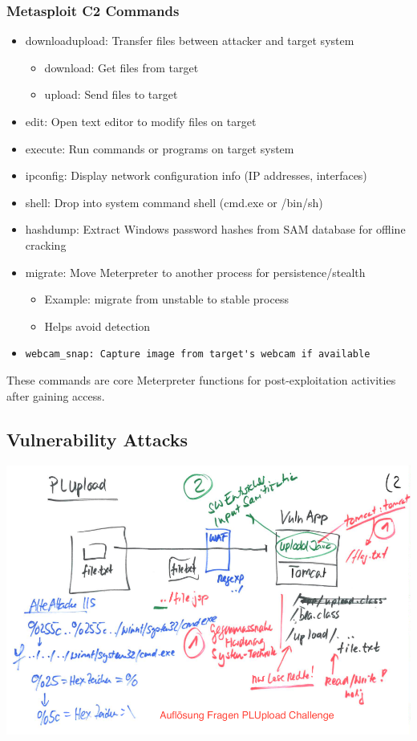 \subsubsection*{Metasploit C2 Commands}
\begin{itemize}
	\item download\/upload: Transfer files between attacker and target system
  \begin{itemize}
    \tightlist
		\item download: Get files from target
		\item upload: Send files to target
	\end{itemize}

	\item edit: Open text editor to modify files on target

	\item execute: Run commands or programs on target system

	\item ipconfig: Display network configuration info (IP addresses, interfaces)

	\item shell: Drop into system command shell (cmd.exe or /bin/sh)

	\item hashdump: Extract Windows password hashes from SAM database for offline cracking

	\item migrate: Move Meterpreter to another process for persistence/stealth
  \begin{itemize}
    \tightlist
		\item Example: migrate from unstable to stable process
		\item Helps avoid detection
	\end{itemize}
	\item \lstinline|webcam_snap: Capture image from target's webcam if available|
\end{itemize}
These commands are core Meterpreter functions for post-exploitation activities after gaining access.

\subsection{Vulnerability Attacks}
\includegraphics[scale=0.5]{resources/03-plupload.png}

